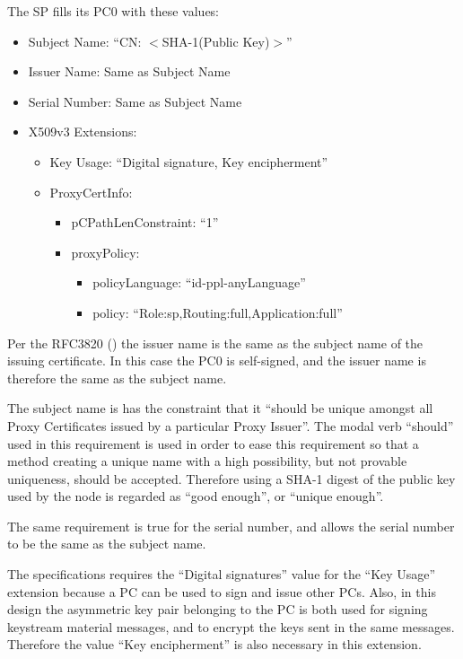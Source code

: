 The \ac{SP} fills its \ac{PC0} with these values:
\begin{itemize}
  \item Subject Name: ``CN: $<$SHA-1(Public Key)$>$''
  \item Issuer Name: Same as Subject Name
  \item Serial Number: Same as Subject Name
  \item X509v3 Extensions:
  \begin{itemize}
    \item Key Usage: ``Digital signature, Key encipherment''
    \item ProxyCertInfo:
    \begin{itemize}
      \item pCPathLenConstraint: ``1''
      \item proxyPolicy: 
      \begin{itemize}
        \item policyLanguage: ``id-ppl-anyLanguage''
        \item policy: ``Role:sp,Routing:full,Application:full''
      \end{itemize}
    \end{itemize}
  \end{itemize}
\end{itemize}
Per the RFC3820 (\cite{rfc3820}) the issuer name is the same as the subject name
of the issuing certificate. In this case the \ac{PC0} is self-signed, and the
issuer name is therefore the same as the subject name. 

The subject name is has the constraint that it ``should be unique amongst all
Proxy Certificates issued by a particular Proxy Issuer''. The modal verb
``should'' used in this requirement is used in order to ease this requirement so
that a method creating a unique name with a high possibility, but not provable
uniqueness, should be accepted. Therefore using a SHA-1 digest of the public key
used by the node is regarded as ``good enough'', or ``unique enough''.

The same requirement is true for the serial number, and allows the serial number
to be the same as the subject name.

The specifications requires the ``Digital signatures'' value for the ``Key
Usage'' extension because a \ac{PC} can be used to sign and issue other
\acp{PC}. Also, in this design the asymmetric key pair belonging to the \ac{PC}
is both used for signing keystream material messages, and to encrypt the keys
sent in the same messages. Therefore the value ``Key encipherment'' is also
necessary in this extension.

